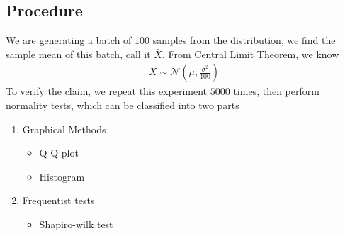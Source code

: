 \documentclass{article}
\begin{document}
\subsection{Procedure}
We are generating a batch of $100$ samples from the distribution, we find the sample mean of this batch, call it $\bar{X}$. From Central Limit Theorem, we know
\begin{align}
    \bar{X} \sim \mathcal{N}(\mu, \frac{\sigma^2}{100})
\end{align}
To verify the claim, we repeat this experiment $5000$ times, then perform normality tests, which can be classified into two parts
\begin{enumerate}
    \item Graphical Methods
    \begin{itemize}
        \item Q-Q plot
        \item Histogram
    \end{itemize}
    \item{Frequentist tests}
    \begin{itemize}
        \item Shapiro-wilk test
    \end{itemize}
\end{enumerate}
\end{document}
